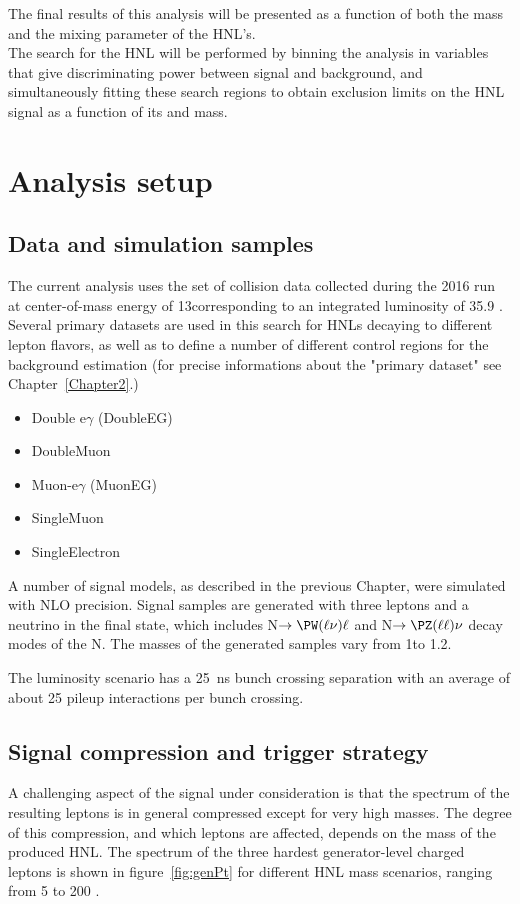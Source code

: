 The final results of this analysis will be presented as a function of both the mass and the mixing parameter of the HNL's. \\
The search for the HNL will be performed by binning the analysis in
variables that give discriminating power between signal and
background, and simultaneously fitting these search regions to obtain
exclusion limits on the HNL signal as a function of its \mixpar and
mass. 

\section{Analysis setup}
\subsection{Data and simulation samples}
The current analysis uses the set of \Pp collision data collected during the 2016 run at center-of-mass energy of 13\TeV corresponding to
an integrated luminosity of 35.9 \fbinv. Several primary datasets are used in this search for HNLs decaying to different lepton flavors, as well as to 
define a number of different control regions for the background estimation (for precise
informations about the "primary dataset" see Chapter~\ref{Chapter2}.)

{\footnotesize
\begin{itemize}
\setlength\itemsep{-0.1em}
\item Double e$\gamma$ (DoubleEG)
\item DoubleMuon
\item Muon-e$\gamma$ (MuonEG)
\item SingleMuon
\item SingleElectron
\end{itemize} }

A number of signal models, as described in the previous
Chapter, were simulated with NLO precision. Signal
samples are generated with three leptons and a neutrino in the final
state, which includes N$\to\PW(\ell\nu)\ell$ and
N$\to\PZ(\ell\ell)\nu$ decay modes of the N. The \hnl masses of the
generated samples vary from 1\GeV to 1.2\TeV. 

The luminosity scenario has a 25~ns bunch crossing separation with an average of about 25 pileup interactions per bunch crossing.

\subsection{Signal compression and trigger strategy}\label{sec:compression}
A challenging aspect of the signal under consideration is that the \pt spectrum of the resulting leptons is in general compressed except for very high masses. The degree of this compression, and which leptons are affected, depends on the mass of the produced HNL. The \pt spectrum of the three hardest generator-level charged leptons is shown in figure~\ref{fig:genPt} for different HNL mass scenarios, ranging from 5 to 200 \GeV . 

